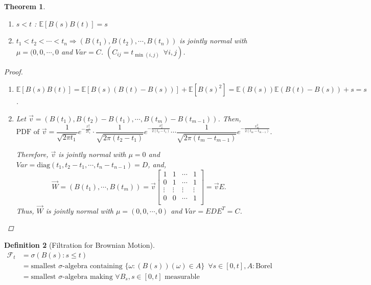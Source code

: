 \documentclass[12pt]{report}
\newcommand{\F}{\mathcal{F}}
\newcommand{\E}{\mathbb{E}}
\renewcommand{\1}{\mathbb{1}}
\theoremstyle{break}
\newtheorem{thm}{Theorem}[section] %
\theoremstyle{newdef}
\newtheorem{defn}[thm]{Definition} %
\theoremstyle{remark}
\begin{document}
\begin{thm}
\leavevmode
\vspace{-6mm}
\begin{enumerate}
\item $s < t$ : $\E[B(s)B(t)] = s$

\item $t_1 < t_2 < \cdots < t_n \Rightarrow (B(t_1), B(t_2), \cdots, B(t_n))$ is jointly normal with $\mu = (0,0,\cdots,0$ and $Var = C$.
$(C_{ij} = t_{\min(i,j)} \enspace \forall i,j)$.
\end{enumerate}

\begin{proof}
\leavevmode
\begin{enumerate}
\item
$\E[B(s)B(t)] = \E[B(s)(B(t)-B(s))] + \E[B(s)^2]
= \E(B(s))\E(B(t)-B(s)) + s = s$.

\item
Let $\vec{v} = (B(t_1), B(t_2)-B(t_1),\cdots,B(t_m)-B(t_{m-1}))$. Then,
$$
\text{PDF of } \vec{v}
= \frac{1}{\sqrt{2\pi t_1}}e^{-\frac{x_1^2}{2t_1}} \cdot \frac{1}{\sqrt{2\pi (t_2 - t_1)}}e^{-\frac{x_2^2}{2(t_2-t_1)}} \cdots \frac{1}{\sqrt{2\pi (t_m-t_{m-1})}}e^{-\frac{x_m^2}{2(t_m-t_{m-1})}}.
$$

Therefore, $\vec{v}$ is jointly normal with $\mu = 0$ and $Var = \text{diag}(t_1, t_2-t_1, \cdots, t_n-t_{n-1}) = D$, and,
$$
\vec{W}
= (B(t_1), \cdots, B(t_m))
= \vec{v}
\begin{bmatrix}
1 & 1 &\cdots &1\\
0 & 1 &\cdots &1\\
\vdots & \vdots & \vdots & \vdots\\
0 & 0 &\cdots &1\\
\end{bmatrix}
= \vec{v}E.
$$
Thus, $\vec{W}$ is jointly normal with $\mu = (0,0,\cdots,0)$ and $Var = EDE^T = C$.
\end{enumerate}
\end{proof}
\end{thm}


\begin{defn}[Filtration for Brownian Motion]
$$
\begin{aligned}
\F_t &= \sigma(B(s) : s \leq t)\\
&= \text{smallest } \sigma\text{-algebra containing } \{\omega: (B(s))(\omega) \in A\} \enspace \forall s \in [0,t], A: \text{Borel}\\
&= \text{smallest } \sigma\text{-algebra making } \forall B_s, s\in[0,t] \text{ measurable}
\end{aligned}
$$
\end{defn}
\end{document}
